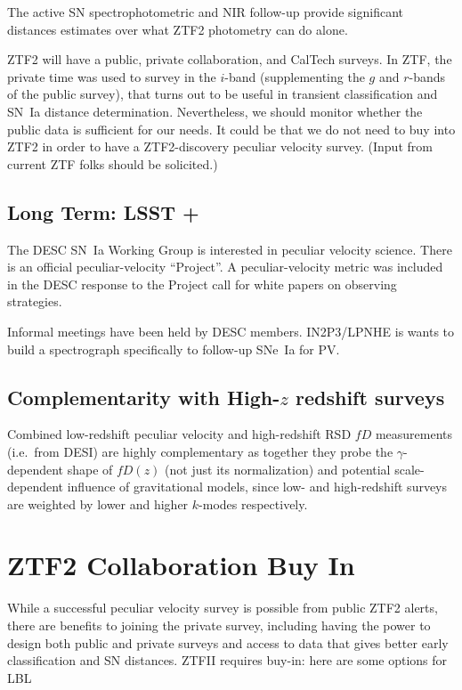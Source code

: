 \documentclass[11pt, oneside]{article}   	%
\begin{document}
The active SN spectrophotometric and NIR follow-up provide significant distances estimates over
what ZTF2 photometry can do alone.

ZTF2 will have a public, private collaboration, and CalTech surveys.    In ZTF,
the private time was used to survey in the $i$-band (supplementing the $g$ and $r$-bands of the public survey), that turns out to be useful in transient classification and SN~Ia distance determination.
Nevertheless, we should monitor whether the public data is sufficient for our needs.  It could be that we do not need to buy into ZTF2 in order to have
a ZTF2-discovery peculiar velocity survey.  (Input from current ZTF folks should be solicited.)

\subsection{Long Term: LSST +}
The DESC SN~Ia Working Group is interested in peculiar velocity science.  There is an official peculiar-velocity ``Project''.  A peculiar-velocity
metric was included in the DESC response to the Project call for white papers on observing strategies.

Informal meetings have been held by DESC members.
IN2P3/LPNHE is wants to build a spectrograph specifically to follow-up SNe~Ia for PV.

\subsection{Complementarity with High-$z$ redshift surveys}
Combined low-redshift peculiar velocity and high-redshift RSD $fD$ measurements (i.e.\ from DESI) are highly complementary as together they probe the
$\gamma$-dependent shape of $fD(z)$ (not just its normalization) and potential scale-dependent influence of gravitational models, since low-
and high-redshift surveys are weighted by lower and higher $k$-modes respectively.

\section{ZTF2 Collaboration Buy In}

While a successful peculiar velocity survey is possible from public ZTF2 alerts,
there are benefits to joining the private survey, including having the power to design both public and private surveys and
access to data that gives better early classification and SN distances.
ZTFII requires buy-in: here are some options for LBL
\end{document}
